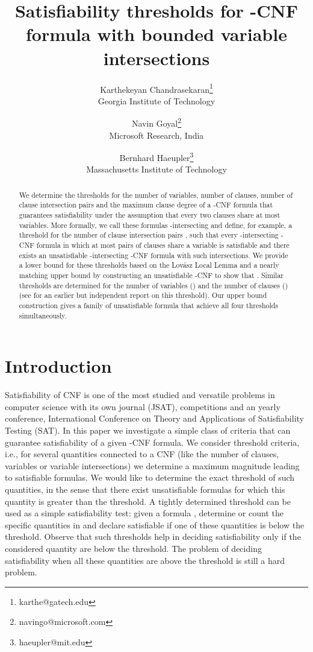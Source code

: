 \documentclass[11pt,letterpaper]{article}
\title{Satisfiability thresholds for -CNF formula with bounded variable intersections}
\author{Karthekeyan Chandrasekaran\thanks{karthe@gatech.edu} \\ \small Georgia Institute of Technology \and Navin Goyal\thanks{navingo@microsoft.com}\\ \small Microsoft Research, India \and Bernhard Haeupler\thanks{haeupler@mit.edu} \\ \small Massachusetts Institute of Technology}
\date{}
\begin{document}
\maketitle

\begin{abstract}
We determine the thresholds for the number of variables, number of clauses, number of clause intersection pairs and the maximum clause degree of a -CNF formula that guarantees satisfiability under the assumption that every two clauses share at most  variables. More formally, we call these formulas -intersecting and define, for example, a threshold  for the number of clause intersection pairs , such that every -intersecting -CNF formula in which at most  pairs of clauses share a variable is satisfiable and there exists an unsatisfiable -intersecting -CNF formula with  such intersections. We provide a lower bound for these thresholds based on the Lov\'asz Local Lemma and a nearly matching upper bound by constructing an unsatisfiable -CNF to show that . Similar thresholds are determined for the number of variables () and the number of clauses () (see \cite{scheder08almostdisjoint} for an earlier but independent report on this threshold). Our upper bound construction gives a family of unsatisfiable formula that achieve all four thresholds simultaneously.
\end{abstract}



\bigskip

\section{Introduction}

Satisfiability of CNF is one of the most studied and versatile problems in computer science with its own journal (JSAT), competitions and an yearly conference, International Conference on Theory and Applications of Satisfiability Testing (SAT). In this paper we investigate a simple class of criteria that can guarantee satisfiability of a given -CNF formula. We consider threshold criteria, i.e., for several quantities connected to a CNF (like the number of clauses, variables or variable intersections) we determine a maximum magnitude leading to satisfiable formulas. We would like to determine the exact threshold of such quantities, in the sense that there exist unsatisfiable formulas for which this quantity is greater than the threshold. A tightly determined threshold can be used as a simple satisfiability test: given a formula , determine or count the specific quantities in  and declare  satisfiable if one of these quantities is below the threshold. Observe that such thresholds help in deciding satisfiability only if the considered quantity are below the threshold. The problem of deciding satisfiability when all these quantities are above the threshold is still a hard problem.\\
\end{document}
